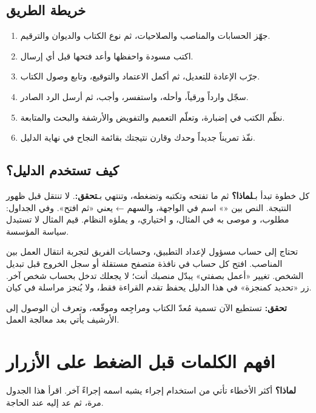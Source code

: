 \subsection{خريطة الطريق}
\begin{enumerate}
\item جهّز الحسابات والمناصب والصلاحيات، ثم نوع الكتاب والديوان والترقيم.
\item اكتب مسودة واحفظها وأعد فتحها قبل أي إرسال.
\item جرّب الإعادة للتعديل، ثم أكمل الاعتماد والتوقيع، وتابع وصول الكتاب.
\item سجّل وارداً ورقياً، وأحله، واستفسر، وأجب، ثم أرسل الرد الصادر.
\item نظّم الكتب في إضبارة، وتعلّم التعميم والتفويض والأرشفة والبحث والمتابعة.
\item نفّذ تمريناً جديداً وحدك وقارن نتيجتك بقائمة النجاح في نهاية الدليل.
\end{enumerate}

\subsection{كيف تستخدم الدليل؟}
كل خطوة تبدأ بـ\textbf{لماذا؟} ثم ما تفتحه وتكتبه وتضغطه، وتنتهي بـ\textbf{تحقق:}. لا تنتقل قبل ظهور النتيجة. النص بين «» اسم في الواجهة، والسهم ← يعني «ثم افتح». وفي الجداول: \req{} مطلوب، و\rec{} موصى به في المثال، و\opt{} اختياري، و\gen{} يملؤه النظام. قيم المثال لا تستبدل سياسة المؤسسة.

تحتاج إلى حساب مسؤول لإعداد التطبيق، وحسابات الفريق لتجربة انتقال العمل بين المناصب. افتح كل حساب في نافذة متصفح مستقلة أو سجل الخروج قبل تبديل الشخص. تغيير «أعمل بصفتي» يبدّل منصبك أنت؛ لا يجعلك تدخل بحساب شخص آخر. زر «تحديد كمنجزة» في هذا الدليل يحفظ تقدم القراءة فقط، ولا يُنجز مراسلة في كيان.

\textbf{تحقق:} تستطيع الآن تسمية مُعدّ الكتاب ومراجِعه وموقّعه، وتعرف أن الوصول إلى الأرشيف يأتي بعد معالجة العمل.

\section{افهم الكلمات قبل الضغط على الأزرار}
\label{sec:words}
\textbf{لماذا؟} أكثر الأخطاء تأتي من استخدام إجراء يشبه اسمه إجراءً آخر. اقرأ هذا الجدول مرة، ثم عد إليه عند الحاجة.

